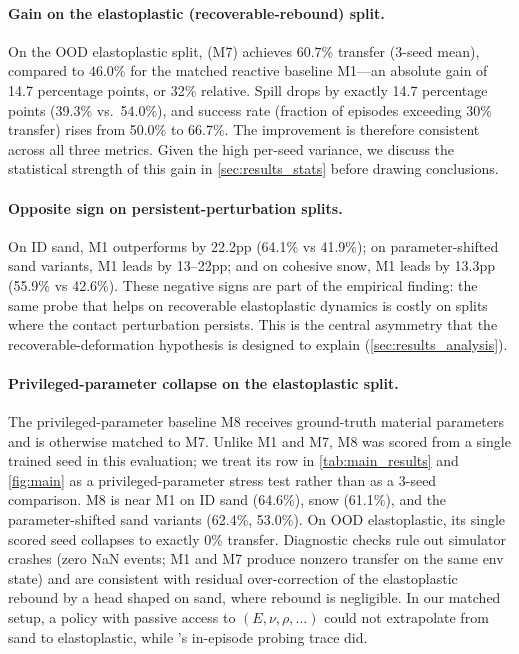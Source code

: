 \paragraph{Gain on the elastoplastic (recoverable-rebound) split.}
On the OOD elastoplastic split, \PTA{} (M7) achieves $60.7$\% transfer (3-seed mean), compared to $46.0$\% for the matched reactive baseline M1---an absolute gain of 14.7 percentage points, or 32\% relative. Spill drops by exactly 14.7 percentage points (39.3\% vs.\ 54.0\%), and success rate (fraction of episodes exceeding 30\% transfer) rises from 50.0\% to 66.7\%. The improvement is therefore consistent across all three metrics. Given the high per-seed variance, we discuss the statistical strength of this gain in \cref{sec:results_stats} before drawing conclusions.

\paragraph{Opposite sign on persistent-perturbation splits.}
On ID sand, M1 outperforms \PTA{} by 22.2pp (64.1\% vs 41.9\%); on parameter-shifted sand variants, M1 leads by 13--22pp; and on cohesive snow, M1 leads by 13.3pp (55.9\% vs 42.6\%). These negative signs are part of the empirical finding: the same probe that helps on recoverable elastoplastic dynamics is costly on splits where the contact perturbation persists. This is the central asymmetry that the recoverable-deformation hypothesis is designed to explain (\cref{sec:results_analysis}).

\paragraph{Privileged-parameter collapse on the elastoplastic split.}
The privileged-parameter baseline M8 receives ground-truth material parameters and is otherwise matched to M7. Unlike M1 and M7, M8 was scored from a single trained seed in this evaluation; we treat its row in \cref{tab:main_results} and \cref{fig:main} as a privileged-parameter stress test rather than as a 3-seed comparison. M8 is near M1 on ID sand (64.6\%), snow (61.1\%), and the parameter-shifted sand variants (62.4\%, 53.0\%). On OOD elastoplastic, its single scored seed collapses to exactly 0\% transfer. Diagnostic checks rule out simulator crashes (zero NaN events; M1 and M7 produce nonzero transfer on the same env state) and are consistent with residual over-correction of the elastoplastic rebound by a head shaped on sand, where rebound is negligible. In our matched setup, a policy with passive access to $(E, \nu, \rho, \dots)$ could not extrapolate from sand to elastoplastic, while \PTA{}'s in-episode probing trace did.


